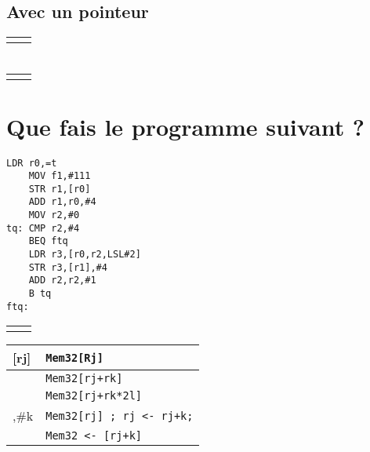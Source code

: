 \documentclass[12pt,a4paper,openany]{book}
\begin{document}
\subsection{Avec un pointeur}
\begin{tabular}{p{6cm}p{6cm}}

	&

\end{tabular}
\section{}
\begin{tabular}{p{6cm}p{6cm}}

	&

\end{tabular}
\section{Que fais le programme suivant ? }
\begin{lstlisting}[language=ARM]
	LDR r0,=t
	MOV f1,#111
	STR r1,[r0]
	ADD r1,r0,#4
	MOV r2,#0
tq: CMP r2,#4
	BEQ ftq
	LDR r3,[r0,r2,LSL#2]
	STR r3,[r1],#4
	ADD r2,r2,#1
	B tq
ftq:
\end{lstlisting}
\begin{tabular}{p{6cm}p{6cm}}

	&

\end{tabular}
\appendix
\begin{tabular}{l l}
	[rj] & \texttt{Mem32[Rj]}\\
	\hline
	[rj,rk] & \texttt{Mem32[rj+rk]}\\
	\hline
	[rj,rk,LSL\#l] & \texttt{Mem32[rj+rk*2l]}\\
	\hline
	[rj],\#k & \texttt{Mem32[rj] ; rj <- rj+k;}\\
	\hline
	[rj,\#k] & \texttt{Mem32 <- [rj+k]}\\
\end{tabular}
\end{document}
